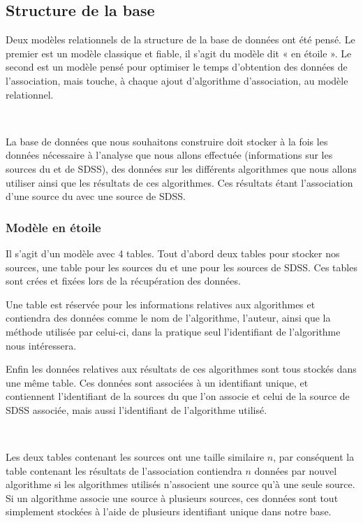 	\subsection{Structure de la base}

Deux modèles relationnels de la structure de la base de données ont été pensé. Le premier est un modèle classique et fiable, il s'agit du modèle dit « en étoile ». Le second est un modèle pensé pour optimiser le temps d'obtention des données de l'association, mais touche, à chaque ajout d'algorithme d'association, au modèle relationnel.

\ 

La base de données que nous souhaitons construire doit stocker à la fois les données nécessaire à l'analyse que nous allons effectuée (informations sur les sources du \stack{} et de SDSS), des données sur les différents algorithmes que nous allons utiliser ainsi que les résultats de ces algorithmes. Ces résultats étant l'association d'une source du \stack{} avec une source de SDSS.

		\subsubsection{Modèle en étoile}

Il s'agit d'un modèle avec 4 tables. Tout d'abord deux tables pour stocker nos sources, une table pour les sources du \stack{} et une pour les sources de SDSS. Ces tables sont crées et fixées lors de la récupération des données.

Une table est réservée pour les informations relatives aux algorithmes et contiendra des données comme le nom de l'algorithme, l'auteur, ainsi que la méthode utilisée par celui-ci, dans la pratique seul l'identifiant de l'algorithme nous intéressera.

Enfin les données relatives aux résultats de ces algorithmes sont tous stockés dans une même table. Ces données sont associées à un identifiant unique, et contiennent l'identifiant de la sources du \stack{} que l'on associe et celui de la source de SDSS associée, mais aussi l'identifiant de l'algorithme utilisé.

\ 

Les deux tables contenant les sources ont une taille similaire $n$, par conséquent la table contenant les résultats de l'association contiendra $n$ données par nouvel algorithme si les algorithmes utilisés n'associent une source qu'à une seule source. Si un algorithme associe une source à plusieurs sources, ces données sont tout simplement stockées à l'aide de plusieurs identifiant unique dans notre base.


